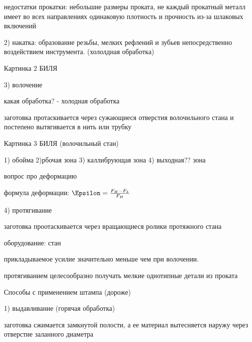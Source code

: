 {\begin{center}
    \par недостатки прокатки: небольшие размеры проката, не каждый прокатный металл имеет во всех направлениях одинаковую плотность и прочность из-за шлаковых включений

    \par 2) накатка: образование резьбы, мелких рефлений и зубьев непосредственно воздействием инструмента.  (хололдная обработка)

    \par Картинка 2 БИЛЯ

    \par 3) волочение

    \par какая обработка? - холодная обработка

    \par заготовка протаскивается через сужающиеся отверстия волочильного стана и постепено вытягивается в нить или трубку

    \par Картинка 3 БИЛЯ (волочильный стан)

    \par 1) обойма 2)рбочая зона 3) каллибрующая зона 4) выходная?? зона

    \par вопрос про деформацию

    \par формула деформации: $\Epsilon = \frac{F_H - F_k}{F_H}$

    \par 4) протягивание

    \par заготовка проотаскивается  через вращающиеся ролики протяжного стана

    \par оборудование: стан

    \par прикладываемое усилие значительно меньше чем при волочении.

    \par протягиванием целесообразно получать мелкие однотипные детали из проката 

    \par  Способы с применением штампа (дороже)

    \par 1) выдавливание (горячая обработка)

    \par заготовка сжимается замкнутой полости, а ее материал вытесняется наружу через отверстие заланного диаметра


\end{center}}
